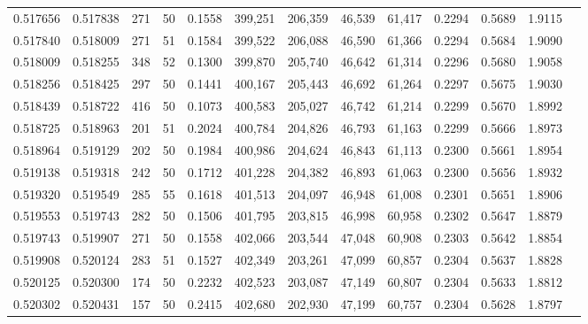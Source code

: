 \begin{tabular}{rrrrrrrrrrrrr}
0.517656 & 0.517838 &   271 &  50 &                                     0.1558 & 399,251 & 206,359 &  46,539 &  61,417 & 0.2294 & 0.5689 & 1.9115 \\
0.517840 & 0.518009 &   271 &  51 &                                     0.1584 & 399,522 & 206,088 &  46,590 &  61,366 & 0.2294 & 0.5684 & 1.9090 \\
0.518009 & 0.518255 &   348 &  52 &                                     0.1300 & 399,870 & 205,740 &  46,642 &  61,314 & 0.2296 & 0.5680 & 1.9058 \\
0.518256 & 0.518425 &   297 &  50 &                                     0.1441 & 400,167 & 205,443 &  46,692 &  61,264 & 0.2297 & 0.5675 & 1.9030 \\
0.518439 & 0.518722 &   416 &  50 &                                     0.1073 & 400,583 & 205,027 &  46,742 &  61,214 & 0.2299 & 0.5670 & 1.8992 \\
0.518725 & 0.518963 &   201 &  51 &                                     0.2024 & 400,784 & 204,826 &  46,793 &  61,163 & 0.2299 & 0.5666 & 1.8973 \\
0.518964 & 0.519129 &   202 &  50 &                                     0.1984 & 400,986 & 204,624 &  46,843 &  61,113 & 0.2300 & 0.5661 & 1.8954 \\
0.519138 & 0.519318 &   242 &  50 &                                     0.1712 & 401,228 & 204,382 &  46,893 &  61,063 & 0.2300 & 0.5656 & 1.8932 \\
0.519320 & 0.519549 &   285 &  55 &                                     0.1618 & 401,513 & 204,097 &  46,948 &  61,008 & 0.2301 & 0.5651 & 1.8906 \\
0.519553 & 0.519743 &   282 &  50 &                                     0.1506 & 401,795 & 203,815 &  46,998 &  60,958 & 0.2302 & 0.5647 & 1.8879 \\
0.519743 & 0.519907 &   271 &  50 &                                     0.1558 & 402,066 & 203,544 &  47,048 &  60,908 & 0.2303 & 0.5642 & 1.8854 \\
0.519908 & 0.520124 &   283 &  51 &                                     0.1527 & 402,349 & 203,261 &  47,099 &  60,857 & 0.2304 & 0.5637 & 1.8828 \\
0.520125 & 0.520300 &   174 &  50 &                                     0.2232 & 402,523 & 203,087 &  47,149 &  60,807 & 0.2304 & 0.5633 & 1.8812 \\
0.520302 & 0.520431 &   157 &  50 &                                     0.2415 & 402,680 & 202,930 &  47,199 &  60,757 & 0.2304 & 0.5628 & 1.8797 \\

\end{tabular}
